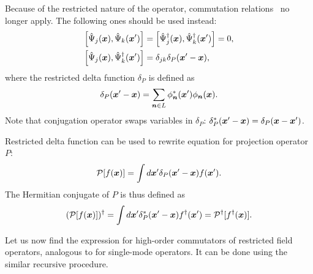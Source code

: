 Because of the restricted nature of the operator, commutation relations~ no longer apply.
The following ones should be used instead:
\begin{equation}
\label{eqn:formalism:func-aux:restricted-commutators}
\begin{split}
	\left[ \hat{\Psi}_j(\boldsymbol{x}), \hat{\Psi}_k(\boldsymbol{x}^\prime) \right]
	& = \left[ \hat{\Psi}_j^\dagger(\boldsymbol{x}), \hat{\Psi}_k^\dagger(\boldsymbol{x}^\prime) \right] = 0, \\
	\left[ \hat{\Psi}_j(\boldsymbol{x}), \hat{\Psi}_k^\dagger(\boldsymbol{x}^\prime) \right]
	& = \delta_{jk} \delta_P(\boldsymbol{x}^\prime - \boldsymbol{x}),
\end{split}
\end{equation}
where the restricted delta function $\delta_P$ is defined as
\begin{equation}
\label{eqn:multimode-formalism:restricted-delta}
	\delta_P(\boldsymbol{x}^\prime - \boldsymbol{x})
	= \sum\limits_{\boldsymbol{n} \in L} \phi_{\boldsymbol{n}}^* (\boldsymbol{x}^\prime) \phi_{\boldsymbol{n}} (\boldsymbol{x}).
\end{equation}
Note that conjugation operator swaps variables in $\delta_P$: $\delta_P^*(\boldsymbol{x}^\prime - \boldsymbol{x}) = \delta_P(\boldsymbol{x} - \boldsymbol{x}^\prime)$.

Restricted delta function can be used to rewrite equation for projection operator $P$:
\[
	\mathcal{P} [f(\boldsymbol{x})] = \int d\boldsymbol{x}^\prime \delta_P(\boldsymbol{x}^\prime - \boldsymbol{x}) f(\boldsymbol{x}^\prime).
\]
The Hermitian conjugate of $P$ is thus defined as
\[
	(\mathcal{P} [f(\boldsymbol{x})])^\dagger
	= \int d\boldsymbol{x}^\prime \delta_P^*(\boldsymbol{x}^\prime - \boldsymbol{x}) f^\dagger(\boldsymbol{x}^\prime)
	= \mathcal{P}^\dagger [f^\dagger(\boldsymbol{x})].
\]


Let us now find the expression for high-order commutators of restricted field operators, analogous to  for single-mode operators.
It can be done using the similar recursive procedure.

